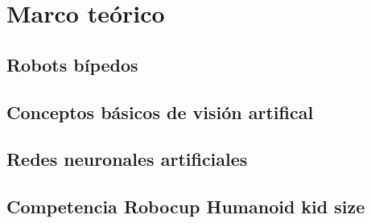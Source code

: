 \chapter{Marco teórico}
\section{Robots bípedos}
\section{Conceptos básicos de visión artifical} 

\section{Redes neuronales artificiales}
    
\section{Competencia Robocup Humanoid kid size}
